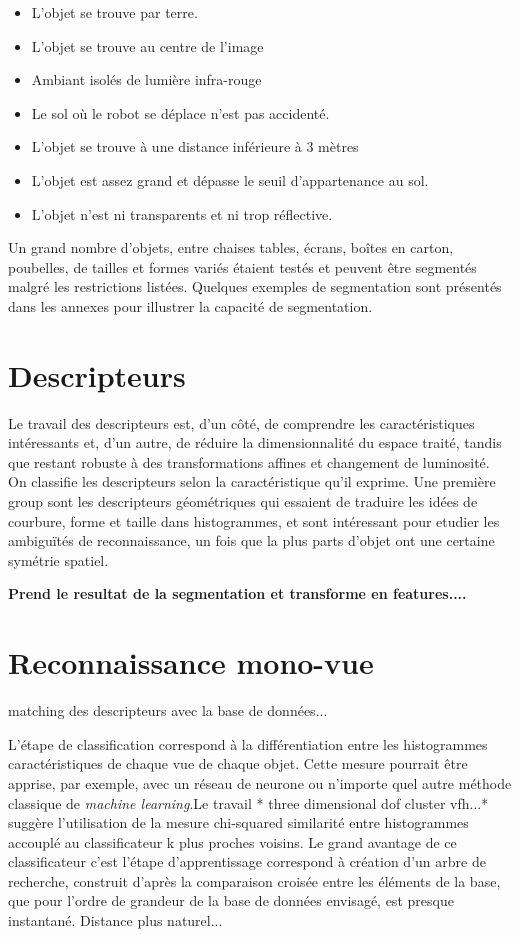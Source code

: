 \begin{itemize}
\item L'objet se trouve par terre.
\item L'objet se trouve au centre de l'image
\item Ambiant isolés de lumière infra-rouge 
\item Le sol où le robot se déplace n'est pas accidenté.
\item L'objet se trouve à une distance inférieure à 3 mètres 
\item L'objet est assez grand et dépasse le seuil d'appartenance au
  sol.
\item L'objet n'est ni transparents et ni trop réflective.
\end{itemize}

Un grand nombre d'objets, entre chaises tables, écrans, boîtes en
carton, poubelles, de tailles et formes variés étaient testés et
peuvent être segmentés malgré les restrictions listées. Quelques
exemples de segmentation sont présentés dans les annexes pour illustrer
la capacité de segmentation.

\section{Descripteurs}

Le travail des descripteurs est, d'un côté, de comprendre les
caractéristiques intéressants et, d'un autre, de réduire la
dimensionnalité du espace traité, tandis que restant robuste à des
transformations affines et changement de luminosité. On classifie les
descripteurs selon la caractéristique qu'il exprime. Une première
group sont les descripteurs géométriques qui essaient de traduire les
idées de courbure, forme et taille dans histogrammes, et sont intéressant
pour etudier les ambiguïtés de reconnaissance, un fois que la plus parts 
d'objet ont une certaine symétrie spatiel.

\textbf{Prend le resultat de la segmentation et transforme en features....}

\section {Reconnaissance mono-vue} 

matching des descripteurs avec la base de données...

L'étape de classification correspond à la différentiation entre les
histogrammes caractéristiques de chaque vue de chaque objet. Cette
mesure pourrait être apprise, par exemple, avec un réseau de neurone
ou n'importe quel autre méthode classique de \textit{machine learning}.{\color{green}Le travail * three dimensional
  dof cluster vfh...* suggère l'utilisation de la mesure chi-squared
  similarité entre histogrammes accouplé au classificateur k plus
  proches voisins. }  Le grand avantage de ce classificateur c'est l'étape
d’apprentissage correspond à création d’un arbre de recherche,
construit d'après la comparaison croisée entre les éléments de la base,
que pour l'ordre de grandeur de la base de données envisagé, est
presque instantané. Distance plus naturel...

